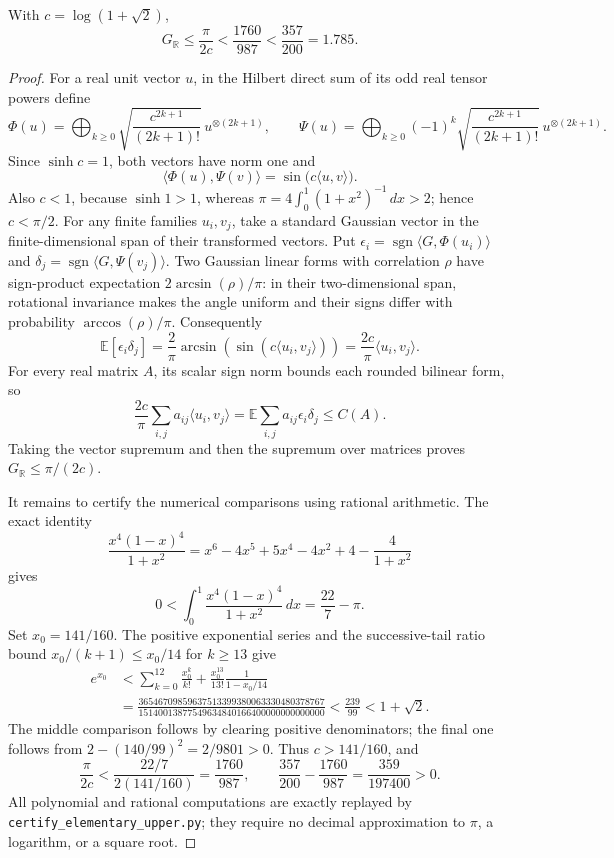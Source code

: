 \begin{proposition}
\label{prop:new-self-contained-upper}
With $c=\log(1+\sqrt2)$,
\[
 G_{\mathbb R}\leq\frac{\pi}{2c}
                <\frac{1760}{987}<\frac{357}{200}=1.785.
\]
\end{proposition}
\begin{proof}
For a real unit vector $u$, in the Hilbert direct sum of its odd
real tensor powers define
\[
 \Phi(u)=\bigoplus_{k\geq0}
       \sqrt{\frac{c^{2k+1}}{(2k+1)!}}\,u^{\otimes(2k+1)},\qquad
 \Psi(u)=\bigoplus_{k\geq0}(-1)^k
       \sqrt{\frac{c^{2k+1}}{(2k+1)!}}\,u^{\otimes(2k+1)}.
\]
Since $\sinh c=1$, both vectors have norm one and
\[
 \langle\Phi(u),\Psi(v)\rangle
                    =\sin\bigl(c\langle u,v\rangle\bigr).
\]
Also $c<1$, because $\sinh1>1$, whereas
$\pi=4\int_0^1(1+x^2)^{-1}\,dx>2$; hence $c<\pi/2$.
For any finite families $u_i,v_j$, take a standard Gaussian vector
in the finite-dimensional span of their transformed vectors.  Put
$\epsilon_i=\operatorname{sgn}\langle G,\Phi(u_i)\rangle$ and
$\delta_j=\operatorname{sgn}\langle G,\Psi(v_j)\rangle$.
Two Gaussian linear forms with correlation $\rho$ have sign-product
expectation $2\arcsin(\rho)/\pi$: in their two-dimensional span,
rotational invariance makes the angle uniform and their signs
 differ with probability $\arccos(\rho)/\pi$.  Consequently
\[
 \mathbb E[\epsilon_i\delta_j]
 =\frac2\pi\arcsin\!\left(\sin(c\langle u_i,v_j\rangle)\right)
 =\frac{2c}{\pi}\langle u_i,v_j\rangle.
\]
For every real matrix $A$, its scalar sign norm bounds each rounded
bilinear form, so
\[
 \frac{2c}{\pi}\sum_{i,j}a_{ij}\langle u_i,v_j\rangle
 =\mathbb E\sum_{i,j}a_{ij}\epsilon_i\delta_j\leq C(A).
\]
Taking the vector supremum and then the supremum over matrices
proves $G_{\mathbb R}\leq\pi/(2c)$.

It remains to certify the numerical comparisons using rational
arithmetic.  The exact identity
\[
 \frac{x^4(1-x)^4}{1+x^2}
 =x^6-4x^5+5x^4-4x^2+4-\frac4{1+x^2}
\]
gives
\[
 0<\int_0^1\frac{x^4(1-x)^4}{1+x^2}\,dx
                         =\frac{22}{7}-\pi.
\]
Set $x_0=141/160$.  The positive exponential series and the
successive-tail ratio bound $x_0/(k+1)\leq x_0/14$ for $k\geq13$
give
\begin{align*}
 e^{x_0}
 &<\sum_{k=0}^{12}\frac{x_0^k}{k!}
       +\frac{x_0^{13}}{13!}\frac1{1-x_0/14}\\
 &=\frac{36546709859637513399380063330480378767}
          {15140013877549634840166400000000000000}
  <\frac{239}{99}<1+\sqrt2.
\end{align*}
The middle comparison follows by clearing positive denominators;
the final one follows from
$2-(140/99)^2=2/9801>0$.  Thus $c>141/160$, and
\[
 \frac\pi{2c}<\frac{22/7}{2(141/160)}
                =\frac{1760}{987},\qquad
 \frac{357}{200}-\frac{1760}{987}=\frac{359}{197400}>0.
\]
All polynomial and rational computations are exactly replayed by
\texttt{certify\_elementary\_upper.py}; they require no decimal
approximation to $\pi$, a logarithm, or a square root.
\end{proof}

